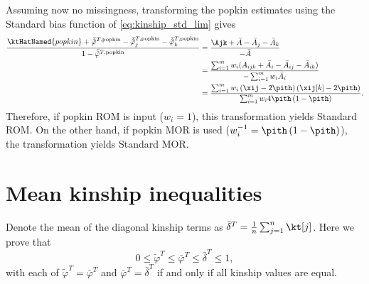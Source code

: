 \documentclass[11pt]{article}
\begin{document}
\begin{appendices}
  Assuming now no missingness, transforming the popkin estimates using the Standard bias function of \cref{eq:kinship_std_lim} gives
  \begin{align*}
    \frac{
    \ktHatNamed{popkin}
    + \bar{ \hat{ \varphi } }^{T,\text{popkin}}
    - \bar{ \hat{ \varphi } }_j^{T,\text{popkin}}
    - \bar{ \hat{ \varphi } }_k^{T,\text{popkin}}
    }{
    1 - \bar{ \hat{ \varphi } }^{T,\text{popkin}}
    }
    &=
      \frac{
      \Ajk
      + \bar{A}
      - \bar{A}_j
      - \bar{A}_k
      }{
      - \bar{A}
      }
    \\
    &=
      \frac{
      \sum_{i=1}^m w_i ( A_{ijk} + \bar{A}_i - \bar{A}_{ij} - \bar{A}_{ik} )
      }{
      - \sum_{i=1}^m w_i \bar{A}_i
      }
    \\
    &=
      \frac{
      \sum_{i=1}^m w_i \left( \xij - 2 \pith \right) \left( \xij[k] - 2 \pith \right)
      }{
      \sum_{i=1}^m w_i 4 \pith \left( 1 - \pith \right)
      }
      .
  \end{align*}
  Therefore, if popkin ROM is input ($w_i=1$), this transformation yields Standard ROM.
  On the other hand, if popkin MOR is used ($w_i^{-1} = \pith \left( 1 - \pith \right)$), the transformation yields Standard MOR.
  
  \section{Mean kinship inequalities}

  \label{sec:mean_kinship_ineqs}

  Denote the mean of the diagonal kinship terms as $\bar{\delta}^T = \frac{1}{n} \sum_{j=1}^n \kt[j]$.
  Here we prove that
  $$
  0 \le \tilde{\varphi}^T \le \bar{\varphi}^T \le \bar{\delta}^T \le 1,
  $$
  with each of $\tilde{\varphi}^T = \bar{\varphi}^T$ and $\bar{\varphi}^T = \bar{\delta}^T$ if and only if all kinship values are equal.


\end{appendices}
\end{document}
